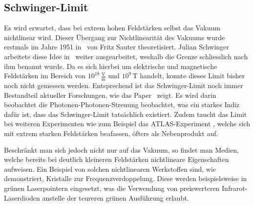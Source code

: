 \subsection{Schwinger-Limit}\label{particles:section:lin-medium:schwinger}
Es wird erwartet, dass bei extrem hohen Feldstärken selbst das Vakuum nichtlinear wird.
Dieser Übergang zur Nichtlinearität des Vakuums wurde erstmals im Jahre 1951 in~\cite{particles:fritz_sauter} von Fritz Sauter theoretisiert.
Julian Schwinger arbeitete diese Idee in~\cite{particles:schwinger-limit} weiter ausgearbeitet, weshalb die Grenze schliesslich nach ihm benannt wurde.
Da es sich hierbei um elektrische und magnetische Feldstärken im Bereich von $10^{18}\,\frac{\text{V}}{\text{m}}$ und $10^9\,\text{T}$ handelt, konnte dieses Limit bisher noch nicht gemessen werden.
Entsprechend ist das Schwinger-Limit noch immer Bestandteil aktueller Forschungen, wie das Paper~\cite{particles:photon_photon_scattering} zeigt.
Es wird darin beobachtet die Photonen-Photonen-Streuung beobachtet, was ein starkes Indiz dafür ist, dass das Schwinger-Limit tatsächlich existiert.
Zudem taucht das Limit bei weiteren Experimenten wie zum Beispiel das ATLAS-Experiment \cite{particles:atlas-experiment}, welche sich mit extrem starken Feldstärken beafassen, öfters als Nebenprodukt auf.

Beschränkt man sich jedoch nicht nur auf das Vakuum, so findet man Medien, welche bereits bei deutlich kleineren Feldstärken nichtlineare Eigenschaften aufweisen.
Ein Beispiel von solchen nichtlinearen Werkstoffen sind, wie~\cite{particles:frequenzverdopplung} demonstriert, Kristalle zur Frequenzverdoppelung.
Diese werden beispielsweise in grünen Laserpointern eingesetzt, was die Verwendung von preiswerteren Infrarot-Laserdioden anstelle der teureren grünen Ausführung erlaubt.
